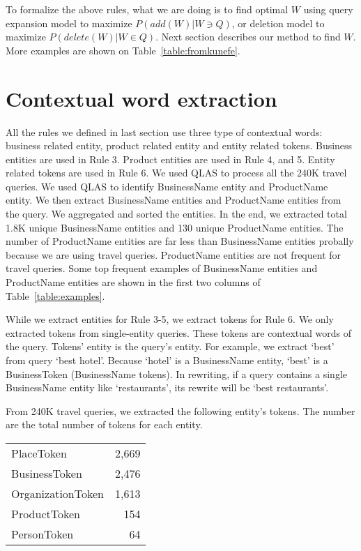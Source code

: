 \documentclass{sig-alternate}
\begin{document}
To formalize the above rules, what we are doing is to find optimal $W$ using query expansion model to maximize $P(add(W)|W \ni Q)$, or deletion model to maximize $P(delete(W)|W \in Q)$. Next section describes our method to find $W$. More examples are shown on Table~\ref{table:fromkunefe}.



\section{Contextual word extraction}

All the rules we defined in last section use  three type of contextual words:  business related entity, product related entity and entity related tokens. Business entities are used in Rule 3. Product entities are used in Rule 4, and 5. Entity related tokens are used in Rule 6. We used QLAS to process all the  240K travel queries. We used QLAS to identify BusinessName entity and ProductName entity. We then extract BusinessName entities  and ProductName entities from the query.  We aggregated and sorted the  entities.   In the end, we extracted total 1.8K unique BusinessName entities and 130 unique ProductName entities. The number of ProductName entities  are far less than BusinessName entities probally because we are using travel queries. ProductName entities are not frequent for travel queries. Some top frequent examples of BusinessName entities and ProductName entities are shown in  the first two columns of Table~\ref{table:examples}. 

While we extract entities for Rule 3-5, we extract tokens for  Rule 6.  We only extracted tokens from single-entity queries. These tokens are contextual words of the query. Tokens' entity is the query's entity. For example, we extract `best' from query `best hotel'. Because `hotel' is a BusinessName entity, `best' is a BusinessToken (BusinessName tokens). In rewriting, if a query contains a single BusinessName entity like `restaurants', its rewrite will be `best restaurants'.

From 240K travel queries, we extracted the following  entity's tokens. The number are the total number of tokens for each entity.

\begin{tabular}{lr}\\
PlaceToken & 2,669 \\
 BusinessToken & 2,476\\
 OrganizationToken & 1,613 \\
 ProductToken & 154 \\
 PersonToken & 64\\
\end{tabular} 
\end{document}
